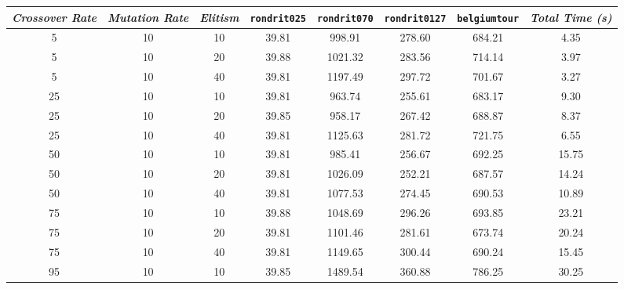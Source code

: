 \begin{table}[H]
\centering

\footnotesize
{\renewcommand{\arraystretch}{1}}
\begin{tabular}{ccc|c|c|c|c|c}
\textit{Crossover Rate} & \textit{Mutation Rate} & \textit{Elitism} & \texttt{rondrit025} & \texttt{rondrit070} & \texttt{rondrit0127} & \texttt{belgiumtour} & \textit{Total Time (s)} \\\hline
5 & 10 & 10 & \cellcolor{gray!50}39.81 & \cellcolor{gray!5}998.91 & \cellcolor{gray!1}278.60 & \cellcolor{gray!43}684.21 & 4.35\\
5 & 10 & 20 & \cellcolor{gray!50}39.88 & \cellcolor{gray!1}1021.32 & \cellcolor{gray!1}283.56 & \cellcolor{gray!34}714.14 & 3.97\\
5 & 10 & 40 & \cellcolor{gray!50}39.81 & \cellcolor{gray!1}1197.49 & \cellcolor{gray!1}297.72 & \cellcolor{gray!38}701.67 & 3.27\\
25 & 10 & 10 & \cellcolor{gray!50}39.81 & \cellcolor{gray!11}963.74 & \cellcolor{gray!1}255.61 & \cellcolor{gray!43}683.17 & 9.30\\
25 & 10 & 20 & \cellcolor{gray!50}39.85 & \cellcolor{gray!12}958.17 & \cellcolor{gray!1}267.42 & \cellcolor{gray!42}688.87 & 8.37\\
25 & 10 & 40 & \cellcolor{gray!50}39.81 & \cellcolor{gray!1}1125.63 & \cellcolor{gray!1}281.72 & \cellcolor{gray!31}721.75 & 6.55\\
50 & 10 & 10 & \cellcolor{gray!50}39.81 & \cellcolor{gray!7}985.41 & \cellcolor{gray!1}256.67 & \cellcolor{gray!41}692.25 & 15.75\\
50 & 10 & 20 & \cellcolor{gray!50}39.81 & \cellcolor{gray!1}1026.09 & \cellcolor{gray!1}252.21 & \cellcolor{gray!42}687.57 & 14.24\\
50 & 10 & 40 & \cellcolor{gray!50}39.81 & \cellcolor{gray!1}1077.53 & \cellcolor{gray!1}274.45 & \cellcolor{gray!41}690.53 & 10.89\\
75 & 10 & 10 & \cellcolor{gray!50}39.88 & \cellcolor{gray!1}1048.69 & \cellcolor{gray!1}296.26 & \cellcolor{gray!40}693.85 & 23.21\\
75 & 10 & 20 & \cellcolor{gray!50}39.81 & \cellcolor{gray!1}1101.46 & \cellcolor{gray!1}281.61 & \cellcolor{gray!46}673.74 & 20.24\\
75 & 10 & 40 & \cellcolor{gray!50}39.81 & \cellcolor{gray!1}1149.65 & \cellcolor{gray!1}300.44 & \cellcolor{gray!41}690.24 & 15.45\\
95 & 10 & 10 & \cellcolor{gray!50}39.85 & \cellcolor{gray!1}1489.54 & \cellcolor{gray!1}360.88 & \cellcolor{gray!12}786.25 & 30.25\\

\end{tabular}
\end{table}
